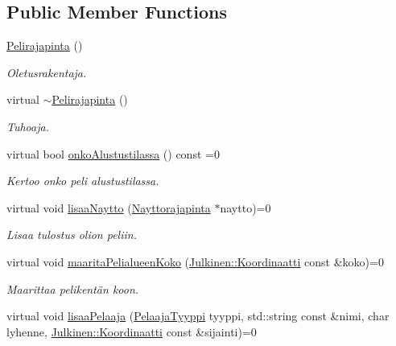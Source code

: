 \subsection*{Public Member Functions}
\begin{DoxyCompactItemize}
\item 
\hyperlink{class_julkinen_1_1_pelirajapinta_a9d639630818d96bdea435e2f36eb667a}{Pelirajapinta} ()
\begin{DoxyCompactList}\small\item\em Oletusrakentaja. \end{DoxyCompactList}\item 
virtual \hyperlink{class_julkinen_1_1_pelirajapinta_acc26ce5341e1a73dff4f3c1e2968b803}{$\sim$\+Pelirajapinta} ()
\begin{DoxyCompactList}\small\item\em Tuhoaja. \end{DoxyCompactList}\item 
virtual bool \hyperlink{class_julkinen_1_1_pelirajapinta_a8e1aafabbb4bd5803d10672d8ad33450}{onko\+Alustustilassa} () const  =0
\begin{DoxyCompactList}\small\item\em Kertoo onko peli alustustilassa. \end{DoxyCompactList}\item 
virtual void \hyperlink{class_julkinen_1_1_pelirajapinta_ad1597bf68505144431c62cc7c6e49bf6}{lisaa\+Naytto} (\hyperlink{class_julkinen_1_1_nayttorajapinta}{Nayttorajapinta} $\ast$naytto)=0
\begin{DoxyCompactList}\small\item\em Lisaa tulostus olion peliin. \end{DoxyCompactList}\item 
virtual void \hyperlink{class_julkinen_1_1_pelirajapinta_aeaa98dab134d9345ef33fbf92224702e}{maarita\+Pelialueen\+Koko} (\hyperlink{class_julkinen_1_1_koordinaatti}{Julkinen\+::\+Koordinaatti} const \&koko)=0
\begin{DoxyCompactList}\small\item\em Maarittaa pelikentän koon. \end{DoxyCompactList}\item 
virtual void \hyperlink{class_julkinen_1_1_pelirajapinta_ac060096b71a764e75436c0dea146b1ef}{lisaa\+Pelaaja} (\hyperlink{namespace_julkinen_ad9a0a9e01af78249f584a93b03db4329}{Pelaaja\+Tyyppi} tyyppi, std\+::string const \&nimi, char lyhenne, \hyperlink{class_julkinen_1_1_koordinaatti}{Julkinen\+::\+Koordinaatti} const \&sijainti)=0

\end{DoxyCompactItemize}
